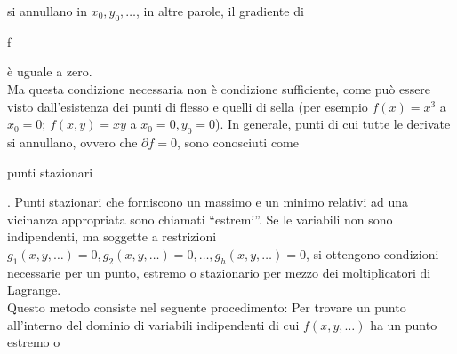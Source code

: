 si annullano in \begin{math}
              x_0, y_0, \dots
             \end{math}, in altre parole, il gradiente di \begin{it}
                                                           f
                                                          \end{it} \`e uguale a zero.\\
Ma questa condizione necessaria non \`e condizione sufficiente, come pu\`o essere visto dall'esistenza 
dei punti di flesso e quelli di sella (per esempio \begin{math}
                                                    f(x) = x^3
                                                   \end{math} a \begin{math}
                                                                 x_0=0
                                                                \end{math}; 
\begin{math}
 f(x,y) = xy
\end{math} a \begin{math}
              x_0=0, y_0=0
             \end{math}). In generale, punti di cui tutte le derivate si annullano, ovvero che 
\begin{math}
 \partial f = 0
\end{math}, 
sono conosciuti come \begin{it}punti stazionari\end{it}. Punti stazionari che forniscono un massimo e un minimo relativi ad una 
vicinanza appropriata sono chiamati ``estremi''.
Se le variabili non sono indipendenti, ma soggette a restrizioni \begin{math}
                                                                  g_1(x,y,\dots) = 0, 
g_2(x,y,\dots) = 0, \dots, g_h(x,y,\dots) = 0   \end{math}, si ottengono condizioni necessarie per un punto, 
estremo o stazionario per mezzo dei moltiplicatori di Lagrange.\\
Questo metodo consiste nel seguente procedimento:
Per trovare un punto all'interno del dominio di variabili indipendenti di cui \begin{math}
                                                                               f(x,y,\dots)
                                                                              \end{math} ha un punto estremo o 
